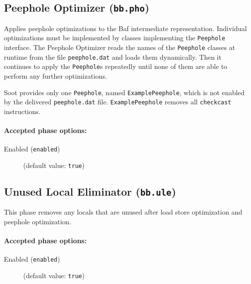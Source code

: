 \documentclass{article}
\begin{document}
\subsection{Peephole Optimizer ({\tt bb.pho})}

Applies peephole optimizations to the Baf intermediate
representation.  Individual optimizations must be implemented by
classes implementing the {\tt Peephole} interface. The
Peephole Optimizer reads the names of the {\tt Peephole}
classes at runtime from the file {\tt peephole.dat} and loads
them dynamically. Then it continues to apply the
{\tt Peephole}s repeatedly until none of them are able to
perform any further optimizations.

\par

Soot provides only one {\tt Peephole}, named
{\tt ExamplePeephole}, which is not enabled by the delivered
{\tt peephole.dat} file.
{\tt ExamplePeephole} removes all {\tt checkcast}
instructions.


\paragraph{Accepted phase options:} 

\begin{description}

\item[Enabled ({\tt enabled})]
(default value: {\tt true})






\end{description}

\subsection{Unused Local Eliminator ({\tt bb.ule})}

This phase removes any locals that are unused after load store optimization
and peephole optimization.


\paragraph{Accepted phase options:} 

\begin{description}

\item[Enabled ({\tt enabled})]
(default value: {\tt true})






\end{description}
\end{document}
